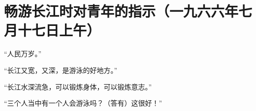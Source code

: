 \section[畅游长江时对青年的指示（一九六六年七月十七日上午）]{畅游长江时对青年的指示（一九六六年七月十七日上午）}


“人民万岁。”

“长江又宽，又深，是游泳的好地方。”

“长江水深流急，可以锻炼身体，可以锻炼意志。”

“三个人当中有一个人会游泳吗？（答有）这很好！”

